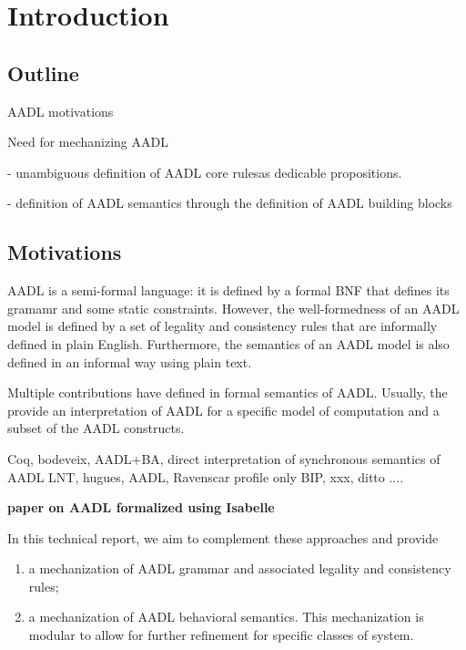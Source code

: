 \chapter{Introduction}
\label{ch:intro}

\section{Outline}

AADL motivations

Need for mechanizing AADL

- unambiguous definition of AADL core rulesas dedicable propositions.

- definition of AADL semantics through the definition of AADL building blocks

\section{Motivations}

AADL is a semi-formal language: it is defined by a formal BNF that defines its gramamr and some static constraints. However, the well-formedness of an AADL model is defined by a set of legality and consistency rules that are informally defined in plain English. Furthermore, the semantics of an AADL model is also defined in an informal way using plain text.

Multiple contributions have defined in formal semantics of AADL. Usually, the provide an interpretation of AADL for a specific model of computation and a subset of the AADL constructs.

Coq, bodeveix, AADL+BA, direct interpretation of synchronous semantics of AADL
LNT, hugues, AADL, Ravenscar profile only
BIP, xxx, ditto
....

\textbf{paper on AADL formalized using Isabelle}

In this technical report, we aim to complement these approaches and provide

\begin{enumerate}
    \item a mechanization of AADL grammar and associated legality and consistency rules;
    \item a mechanization of AADL behavioral semantics. This mechanization is modular to allow for further refinement for specific classes of system.
\end{enumerate}

